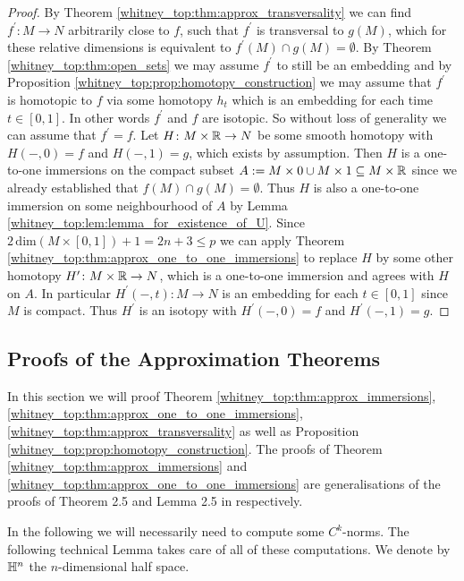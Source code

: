 \begin{proof}
    By Theorem \ref{whitney_top:thm:approx_transversality} we can find $f^\prime \colon M \to N$ arbitrarily close to $f$, such that $f^\prime$ is transversal to $g(M)$, which for these relative dimensions is equivalent to $f^\prime(M) \cap g(M) = \emptyset$. By Theorem \ref{whitney_top:thm:open_sets} we may assume $f^\prime$ to still be an embedding and by Proposition \ref{whitney_top:prop:homotopy_construction} we may assume that $f^\prime$ is homotopic to $f$ via some homotopy $h_t$ which is an embedding for each time $t \in [0,1]$. In other words $f^\prime$ and $f$ are isotopic. So without loss of generality we can assume that $f^\prime = f$. Let $H \colon M \times \mathbb{R} \to N$ be some smooth homotopy with $H(-,0) = f$ and $H(-,1) = g$, which exists by assumption. Then $H$ is a one-to-one immersions on the compact subset $A := M \times 0 \cup M \times 1 \subseteq M \times \mathbb{R}$ since we already established that $f(M) \cap g(M) = \emptyset$. Thus $H$ is also a one-to-one immersion on some neighbourhood of $A$ by Lemma \ref{whitney_top:lem:lemma_for_existence_of_U}. Since $2 \,\mathrm{dim}(M \times [0,1]) +1 = 2n+3 \leq p$ we can apply Theorem \ref{whitney_top:thm:approx_one_to_one_immersions} to replace $H$ by some other homotopy $H^\prime \colon M \times \mathbb{R} \to N$, which is a one-to-one immersion and agrees with $H$ on $A$. In particular $H^\prime(-,t) \colon M \to N$ is an embedding for each $t \in [0,1]$ since $M$ is compact. Thus $H^\prime$ is an isotopy with $H^\prime(-,0) = f$ and $H^\prime(-,1) = g$.
\end{proof}

\subsection{Proofs of the Approximation Theorems}

In this section we will proof Theorem \ref{whitney_top:thm:approx_immersions}, \ref{whitney_top:thm:approx_one_to_one_immersions}, \ref{whitney_top:thm:approx_transversality} as well as Proposition \ref{whitney_top:prop:homotopy_construction}. The proofs of Theorem \ref{whitney_top:thm:approx_immersions} and \ref{whitney_top:thm:approx_one_to_one_immersions} are generalisations of the proofs of Theorem 2.5 and Lemma 2.5 in \cite{adachi1993embeddings} respectively. 

In the following we will necessarily need to compute some $C^k$-norms. The following technical Lemma takes care of all of these computations. We denote by $\mathbb{H}^n$ the $n$-dimensional half space.

